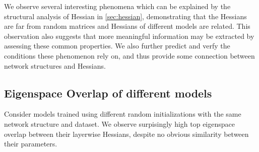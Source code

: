 \label{sec:empirical}
We observe several interesting phenomena which can be explained by the structural analysis of Hessian in \cref{sec:hessian}, demonstrating that the Hessians are far from random matrices and Hessians of different models are related. This observation also suggests that more meaningful information may be extracted by assessing these common properties. We also further predict and verfy the conditions these phenomenon rely on, and thus provide some connection between network structures and Hessians. 

\subsection{Eigenspace Overlap of different models}
\label{sec:models}
Consider models trained using different random initializations with the same network structure and dataset. We observe surpisingly high top eigenspace overlap between their layerwise Hessians, despite no obvious similarity between their parameters.

